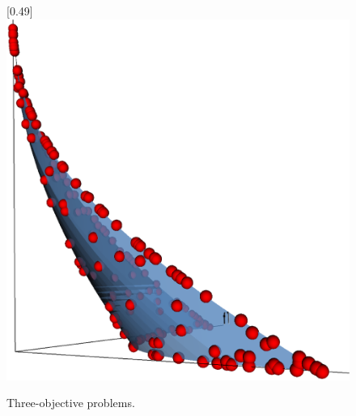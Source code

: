 \documentclass[final,5p,times,twocolumn]{elsarticle}
\begin{document}
\begin{figure}
[0.49\linewidth]{\includegraphics[width=0.36\linewidth]{./figs/res/vtk_DTLZ2x_B.eps}}
\caption{Three-objective problems.}%
\label{fig:three-objA}
\end{figure}
\end{document}
